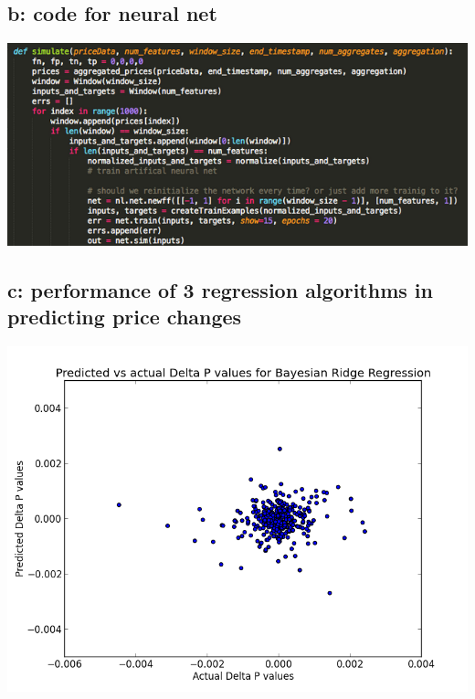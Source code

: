 \documentclass[10pt]{article}
\begin{document}
 \subsection*{b: code for neural net}
 \includegraphics[scale=0.9]{code.png}
 \subsection*{c: performance of 3 regression algorithms in predicting price changes}

 \includegraphics[scale=0.44]{bayesianregression.png}\\
\end{document}
